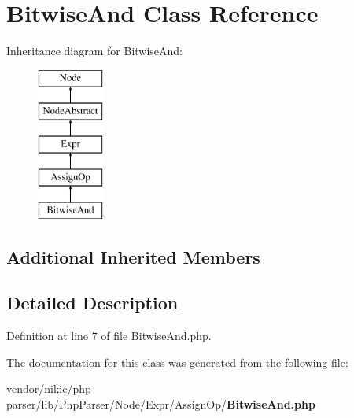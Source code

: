 \section{Bitwise\+And Class Reference}
\label{class_php_parser_1_1_node_1_1_expr_1_1_assign_op_1_1_bitwise_and}
Inheritance diagram for Bitwise\+And\+:\begin{figure}[H]
\begin{center}
\leavevmode
\includegraphics[height=5.000000cm]{class_php_parser_1_1_node_1_1_expr_1_1_assign_op_1_1_bitwise_and}
\end{center}
\end{figure}
\subsection*{Additional Inherited Members}


\subsection{Detailed Description}


Definition at line 7 of file Bitwise\+And.\+php.



The documentation for this class was generated from the following file\+:\begin{DoxyCompactItemize}
\item 
vendor/nikic/php-\/parser/lib/\+Php\+Parser/\+Node/\+Expr/\+Assign\+Op/{\bf Bitwise\+And.\+php}\end{DoxyCompactItemize}
